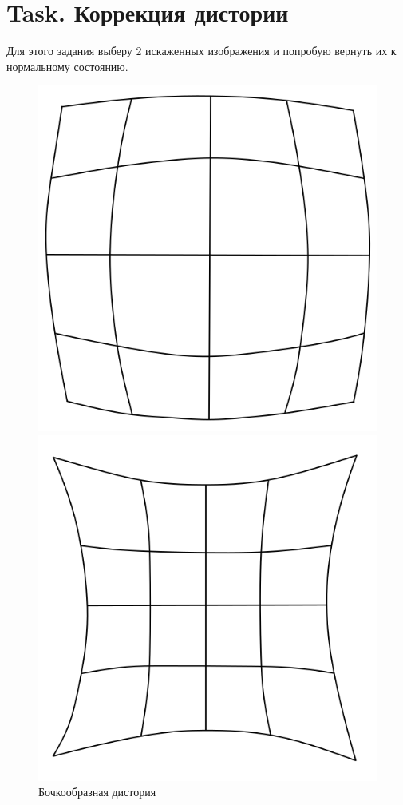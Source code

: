 \documentclass[a4paper,12pt]{article}
\begin{document}
\section{Task. Коррекция дистории}
Для этого задания выберу 2 искаженных изображения и попробую вернуть их к нормальному состоянию.

\begin{figure}[H]
    \centering
    \begin{minipage}{0.48\textwidth}
        \centering
        \includegraphics[width=\linewidth]{lab2/task2/bochka.png}
        \caption{Бочкообразная дистория}
        \label{fig:reflect_ox}
    \end{minipage}
    \hfill
    \begin{minipage}{0.48\textwidth}
        \centering
        \includegraphics[width=\linewidth]{lab2/task2/podushka.png}

\end{minipage}
\end{figure}
\end{document}

